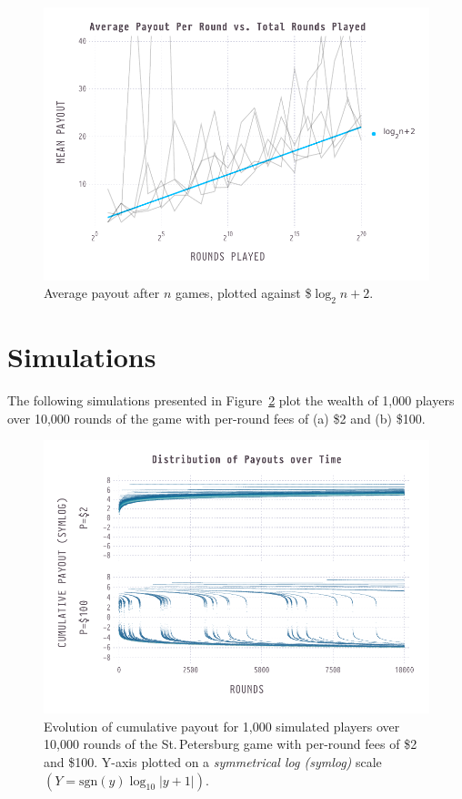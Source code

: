 \documentclass[11pt]{article}
\begin{document}
\begin{figure}
  \centering
  \includegraphics[width=\textwidth]{average-over-time-fit}
  \caption{Average payout after $n$ games, plotted against \$$\log_2n+2$.}
  \label{fig:average-over-time-fit}
\end{figure}

\clearpage
\section{Simulations}

The following simulations presented in Figure~\ref{fig:evolution} plot the wealth of 1,000 players over 10,000 rounds of the game with per-round fees of (a) \$2 and (b) \$100. 

\begin{figure}
  \centering
  \includegraphics[width=\textwidth]{winnings-2-100}
  \caption{Evolution of cumulative payout for 1,000 simulated players over 10,000 rounds of the St.\,Petersburg game with per-round fees of \$2 and \$100. Y-axis plotted on a \textit{symmetrical log (symlog)} scale $\left(Y=\mathrm{sgn}(y)\log_{10}|y+1|\right)$.}
  \label{fig:evolution}
\end{figure}
\end{document}
